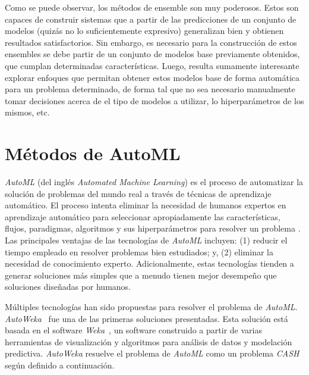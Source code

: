 Como se puede observar, los métodos de ensemble son muy poderosos.
Estos son capaces de construir sistemas que a partir de las predicciones de un conjunto de modelos (quizás no lo suficientemente expresivo) generalizan bien y obtienen resultados satisfactorios.
Sin embargo, es necesario para la construcción de estos ensembles se debe partir de un conjunto de modelos base previamente obtenidos, que cumplan determinadas características.
Luego, resulta sumamente interesante explorar enfoques que permitan obtener estos modelos base de forma automática para un problema determinado, de forma tal que no sea necesario manualmente tomar decisiones acerca de el tipo de modelos a utilizar, lo hiperparámetros de los mismos, etc. 

\section{Métodos de AutoML}\label{section:automl}

\emph{AutoML} (del inglés \textit{Automated Machine Learning}) es el proceso de automatizar la solución de problemas del mundo real a través de técnicas de aprendizaje automático.
El proceso intenta eliminar la necesidad de humanos expertos en aprendizaje automático para seleccionar apropiadamente las características, flujos, paradigmas, algoritmos y sus hiperparámetros para resolver un problema \parencite{Dimitrakakis_Liu_Parkes_Radanovic_2019}.
Las principales ventajas de las tecnologías de \emph{AutoML} incluyen:
(1) reducir el tiempo empleado en resolver problemas bien estudiados; y,
(2) eliminar la necesidad de conocimiento experto.
Adicionalmente, estas tecnologías tienden a generar soluciones más simples que a menudo tienen mejor desempeño que soluciones diseñadas por humanos.

Múltiples tecnologías han sido propuestas para resolver el problema de \emph{AutoML}. \emph{AutoWeka}~\parencite{autoweka} fue una de las primeras soluciones presentadas.
Esta solución está basada en el software \emph{Weka}~\parencite{weka}, un software construido a partir de varias herramientas de visualización y algoritmos para análisis de datos y modelación predictiva. \emph{AutoWeka} resuelve el problema de \emph{AutoML} como un problema \emph{CASH} según definido a continuación.

